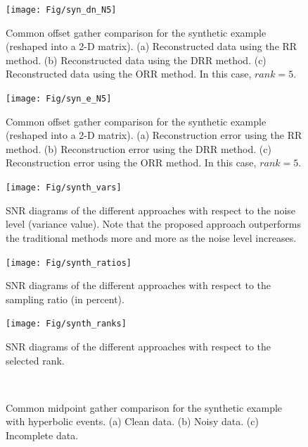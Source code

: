 {\begin{figure}
	\centering
	\texttt{[image: Fig/syn\_dn\_N5]}
	\caption{Common offset gather comparison for the synthetic example (reshaped into a 2-D matrix). (a) Reconstructed data using the RR method. (b) Reconstructed data using the DRR method. (c) Reconstructed data using the ORR method.  In this case, $rank=5$.}
	\label{fig:syn_dn_N5}
\end{figure}

\begin{figure}
	\centering
	\texttt{[image: Fig/syn\_e\_N5]}
	\caption{Common offset gather comparison for the synthetic example (reshaped into a 2-D matrix). (a) Reconstruction error using the RR method. (b) Reconstruction error using the DRR method. (c) Reconstruction error using the ORR method. In this case, $rank=5$. }
	\label{fig:syn_e_N5}
\end{figure}



\begin{figure}
	\centering
	\texttt{[image: Fig/synth\_vars]}
	\caption{SNR diagrams of the different approaches with respect to the noise level (variance value). Note that the proposed approach outperforms the traditional methods more and more as the noise level increases.}
	\label{fig:synth_vars}
\end{figure}


\begin{figure}
	\centering
	\texttt{[image: Fig/synth\_ratios]}
	\caption{SNR diagrams of the different approaches with respect to the sampling ratio (in percent). }
	\label{fig:synth_ratios}
\end{figure}

\begin{figure}
	\centering
	\texttt{[image: Fig/synth\_ranks]}
	\caption{SNR diagrams of the different approaches with respect to the selected rank. }
	\label{fig:synth_ranks}
\end{figure}




\begin{figure}
	\centering
     \\   
	\caption{Common midpoint gather comparison for the synthetic example with hyperbolic events. (a) Clean data. (b) Noisy data. (c) Incomplete data.  }
	\label{fig:hyper_N12}
\end{figure}


}
